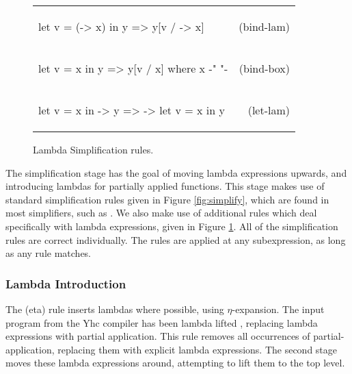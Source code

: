 \documentclass[preprint]{sigplanconf}
\newcommand{\simp}[2]{\vspace{-7mm} #2 & (#1) \\}
\newenvironment{simplify}
    {\noindent
     \begin{flushright}
     \begin{tabular}{p{6.5cm}r}
    }
    {\end{tabular}
     \vspace{-7mm}
     \end{flushright}
    }
\begin{document}
\begin{figure}
\begin{simplify}

\simp{bind-lam}{
\ignore\begin{code}
let v = (\w -> x) in y
    => y[v / \w -> x]
\end{code}}

\simp{bind-box}{
\ignore\begin{code}
let v = x in y
    => y[v / x]
    where x {-" \text{ is a boxed lambda (see \S\ref{sec:inlining})} "-}
\end{code}}

\simp{let-lam}{
\ignore\begin{code}
let v = x in \w -> y
    => \w -> let v = x in y
\end{code}}

\end{simplify}
\caption{Lambda Simplification rules.}
\label{fig:lambda_simplify}
\end{figure}

The simplification stage has the goal of moving lambda expressions upwards, and introducing lambdas for partially applied functions. This stage makes use of standard simplification rules given in Figure \ref{fig:simplify}, which are found in most simplifiers, such as \cite{spj:transformation}. We also make use of additional rules which deal specifically with lambda expressions, given in Figure \ref{fig:lambda_simplify}. All of the simplification rules are correct individually. The rules are applied at any subexpression, as long as any rule matches.

\subsubsection{Lambda Introduction}

The (eta) rule inserts lambdas where possible, using $\eta$-expansion. The input program from the Yhc compiler has been lambda lifted \cite{lambda_lift}, replacing lambda expressions with partial application. This rule removes all occurrences of partial-application, replacing them with explicit lambda expressions. The second stage moves these lambda expressions around, attempting to lift them to the top level.
\end{document}
